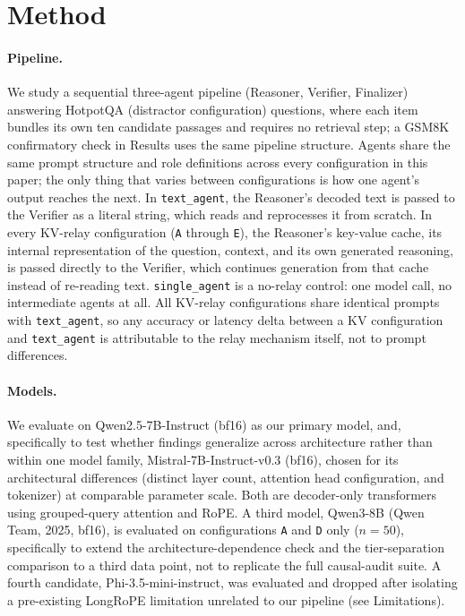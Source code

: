 \documentclass[11pt]{article}
\begin{document}
\section{Method}
\label{sec:method}

\paragraph{Pipeline.} We study a sequential three-agent pipeline
(Reasoner, Verifier, Finalizer) answering HotpotQA \citep{hotpotqa2018}
(distractor configuration) questions, where each item bundles its own
ten candidate passages and requires no retrieval step; a GSM8K
\citep{gsm8k2021} confirmatory check in Results uses the same pipeline
structure. Agents share the same prompt structure and role definitions
across every configuration in this paper; the only thing that varies
between configurations is how one agent's output reaches the next. In
\texttt{text\_agent}, the Reasoner's decoded text is passed to the
Verifier as a literal string, which reads and reprocesses it from
scratch. In every KV-relay configuration (\texttt{A} through \texttt{E}),
the Reasoner's key-value cache, its internal representation of the
question, context, and its own generated reasoning, is passed directly
to the Verifier, which continues generation from that cache instead of
re-reading text. \texttt{single\_agent} is a no-relay control: one model
call, no intermediate agents at all. All KV-relay configurations share
identical prompts with \texttt{text\_agent}, so any accuracy or latency
delta between a KV configuration and \texttt{text\_agent} is attributable
to the relay mechanism itself, not to prompt differences.

\paragraph{Models.} We evaluate on Qwen2.5-7B-Instruct
\citep{qwen2p5_2024} (bf16) as our primary model, and, specifically to
test whether findings generalize across architecture rather than within
one model family, Mistral-7B-Instruct-v0.3 \citep{mistral7b2023} (bf16),
chosen for its architectural differences (distinct layer count, attention
head configuration, and tokenizer) at comparable parameter scale. Both
are decoder-only transformers using grouped-query attention and RoPE. A
third model, Qwen3-8B (Qwen Team, 2025, bf16), is evaluated on
configurations \texttt{A} and \texttt{D} only ($n=50$), specifically to
extend the architecture-dependence check and the tier-separation
comparison to a third data point, not to replicate the full causal-audit
suite. A fourth candidate, Phi-3.5-mini-instruct, was evaluated and
dropped after isolating a pre-existing LongRoPE limitation unrelated to
our pipeline (see Limitations).
\end{document}
